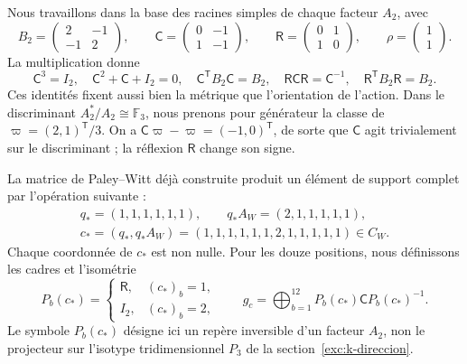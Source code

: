 Nous travaillons dans la base des racines simples de chaque facteur \(A_2\), avec
\begin{equation}
 B_2=\begin{pmatrix}2&-1\\-1&2\end{pmatrix},\qquad
 \mathsf C=\begin{pmatrix}0&-1\\1&-1\end{pmatrix},\qquad
 \mathsf R=\begin{pmatrix}0&1\\1&0\end{pmatrix},\qquad
 \rho=\begin{pmatrix}1\\1\end{pmatrix}.
 \label{km:coxeter-reflexion}
\end{equation}
La multiplication donne
\[
 \mathsf C^3=I_2,\quad
 \mathsf C^2+\mathsf C+I_2=0,\quad
 \mathsf C^{\mathsf T}B_2\mathsf C=B_2,\quad
 \mathsf R\mathsf C\mathsf R=\mathsf C^{-1},\quad
 \mathsf R^{\mathsf T}B_2\mathsf R=B_2.
\]
Ces identités fixent aussi bien la métrique que l'orientation de l'action. Dans le discriminant \(A_2^*/A_2\cong\mathbb F_3\), nous prenons pour générateur la classe de \(\varpi=(2,1)^{\mathsf T}/3\). On a \(\mathsf C\varpi-\varpi=(-1,0)^{\mathsf T}\), de sorte que \(\mathsf C\) agit trivialement sur le discriminant ; la réflexion \(\mathsf R\) change son signe.

La matrice de Paley--Witt déjà construite produit un élément de support
complet par l'opération suivante :
\begin{equation}
 \begin{gathered}
 q_*=(1,1,1,1,1,1),\qquad q_*A_W=(2,1,1,1,1,1),\\
 c_*=(q_*,q_*A_W)
 =(1,1,1,1,1,1,2,1,1,1,1,1)\in C_W.
 \end{gathered}
 \label{km:palabra-total}
\end{equation}
Chaque coordonnée de \(c_*\) est non nulle. Pour les douze positions,
nous définissons les cadres et l'isométrie
\begin{equation}
 P_b(c_*)=
 \begin{cases}\mathsf R,&(c_*)_b=1,\\I_2,&(c_*)_b=2,\end{cases}
 \qquad
 g_c=\bigoplus_{b=1}^{12}P_b(c_*)\mathsf C P_b(c_*)^{-1}.
 \label{km:isometria-ternaria}
\end{equation}
Le symbole \(P_b(c_*)\) désigne ici un repère inversible d’un facteur
\(A_2\), non le projecteur sur l’isotype tridimensionnel \(P_3\)
de la section~\ref{exc:k-direccion}.

